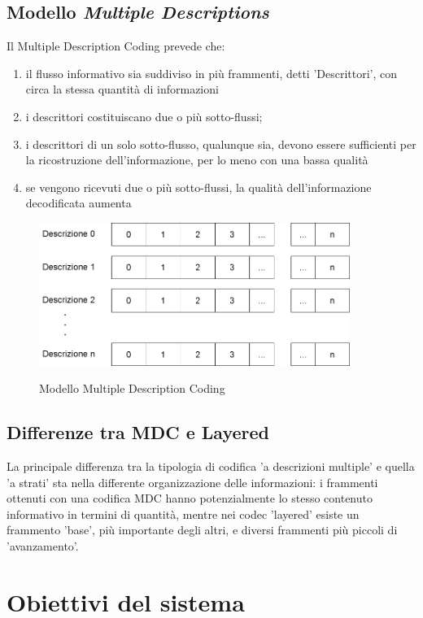 \subsection{Modello \emph{Multiple Descriptions}}

Il Multiple Description Coding prevede che:
\begin{enumerate}
\item il flusso informativo sia suddiviso in più frammenti, detti 'Descrittori', con circa la stessa quantità di informazioni
\item i descrittori costituiscano due o più sotto-flussi;
\item i descrittori di un solo sotto-flusso, qualunque sia, devono essere
sufficienti per la ricostruzione dell'informazione, per lo meno con una bassa
qualità
\item se vengono ricevuti due o più sotto-flussi, la qualità dell'informazione decodificata aumenta 
\end{enumerate}

\begin{figure}[h]
\includegraphics[width=0.90\textwidth]{../images/modello_mdc.png}
\label{fig:modello_mdc}
\caption{Modello Multiple Description Coding}
\end{figure}
\subsection{Differenze tra MDC e Layered}

La principale differenza tra la tipologia di codifica 'a descrizioni multiple' e
quella 'a strati' sta nella differente organizzazione delle informazioni: i
frammenti ottenuti con una codifica MDC hanno potenzialmente lo stesso contenuto
informativo in termini di quantità, mentre nei codec 'layered' esiste un
frammento 'base', più importante degli altri, e diversi frammenti più piccoli di
'avanzamento'.

\section{Obiettivi del sistema}

